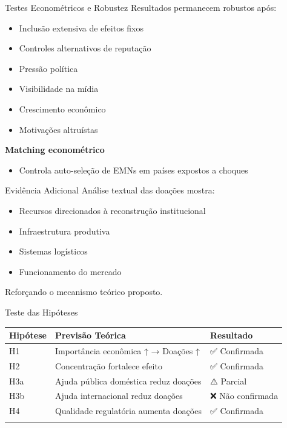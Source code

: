 \documentclass[
  10pt,
  ignorenonframetext,
  aspectratio=169,
  brazilian,
]{beamer}
\providecommand{\tightlist}{%
  \setlength{\itemsep}{0pt}\setlength{\parskip}{0pt}}
\begin{document}
\begin{frame}{Testes Econométricos e Robustez}
\label{testes-economuxe9tricos-e-robustez}
Resultados permanecem robustos após:

\begin{itemize}
\tightlist
\item
  Inclusão extensiva de efeitos fixos
\item
  Controles alternativos de reputação
\item
  Pressão política
\item
  Visibilidade na mídia
\item
  Crescimento econômico
\item
  Motivações altruístas
\end{itemize}

\textbf{Matching econométrico}

\begin{itemize}
\tightlist
\item
  Controla auto-seleção de EMNs em países expostos a choques
\end{itemize}
\end{frame}

\begin{frame}{Evidência Adicional}
\label{eviduxeancia-adicional}
Análise textual das doações mostra:

\begin{itemize}
\tightlist
\item
  Recursos direcionados à reconstrução institucional
\item
  Infraestrutura produtiva
\item
  Sistemas logísticos
\item
  Funcionamento do mercado
\end{itemize}

Reforçando o mecanismo teórico proposto.
\end{frame}

\begin{frame}{Teste das Hipóteses}
\label{teste-das-hipuxf3teses}
\begin{longtable}[]{@{}lll@{}}
\toprule\noalign{}
Hipótese & Previsão Teórica & Resultado \\
\midrule\noalign{}
\endhead
H1 & Importância econômica ↑ → Doações ↑ & ✅ Confirmada \\
H2 & Concentração fortalece efeito & ✅ Confirmada \\
H3a & Ajuda pública doméstica reduz doações & ⚠️ Parcial \\
H3b & Ajuda internacional reduz doações & ❌ Não confirmada \\
H4 & Qualidade regulatória aumenta doações & ✅ Confirmada \\
\bottomrule\noalign{}
\end{longtable}
\end{frame}
\end{document}
